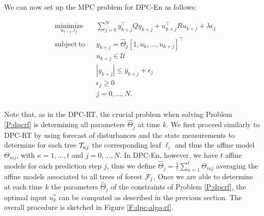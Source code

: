 


\textcolor[rgb]{0,0,1}{We can now set up the MPC problem for DPC-En as follows:}
\begin{problem}\label{P:dpcrf}
	\begin{equation}
		\begin{aligned}
		& \underset{u_{k+j},\epsilon_j}{\mathrm{minimize}} & & \sum_{j=0}^{N} y^\top_{k+j} Q y_{k+j} + u^\top_{k+j} R u_{k+j} + \lambda\epsilon_j \\
		& \mathrm{subject\ to }                 & & y_{k+j}      =  \hat{\Theta}_{j} [1,u_{k},\ldots,u_{k+j} ]^\top                      \\
		&                                       & & u_{k+j}    \in  \mathcal{U}                                                        \\
		&                                       & & |y_{k+j}|  \leq \bar{y}_{k+j} + \epsilon_j 										 \\
		&                                       & & \epsilon_j \geq  0							                                     \\
		&                                       & & j           =    0,\ldots,N.            									         \\
		\end{aligned}
		\label{E:dpcrf}
	\end{equation}
\end{problem}
\textcolor[rgb]{0,0,1}{Note that, as in the DPC-RT, the crucial problem when solving Problem \ref{P:dpcrf} is determining all parameters $\hat{\Theta}_{j}$ at time $k$. We first proceed similarly to DPC-RT by using forecast of disturbances and the state measurements to determine for each tree $\mathcal{T}_{\kappa j}$ the corresponding leaf $\ell_i$ and thus the affine model $\Theta_{i \kappa j}$, with $\kappa = 1,\ldots,t$ and $j = 0,\ldots,N$. In DPC-En, however, we have $t$ affine models for each prediction step $j$, thus we define $\hat{\Theta}_{j} = \frac{1}{t}\sum\limits_{\kappa = 1}^{t} \Theta_{i \kappa j}$ averaging the affine models associated to all trees of forest $\mathcal{F}_j$. Once we are able to determine at each time $k$ the parameters $\hat{\Theta}_{j}$ of the constraints of Problem \ref{P:dpcrf}, the optimal input $u^*_k$ can be computed as described in the previous section. The overall procedure is sketched in Figure \ref{F:dpc-algo-rf}.}

